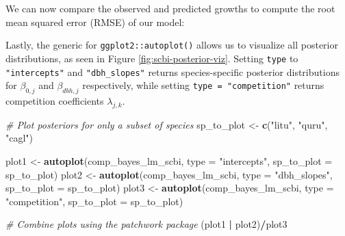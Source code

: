 \documentclass[12pt]{article}
\newenvironment{Shaded}{\begin{snugshade}}{\end{snugshade}}
\newcommand{\CommentTok}[1]{\textcolor[rgb]{0.56,0.35,0.01}{\textit{#1}}}
\newcommand{\DataTypeTok}[1]{\textcolor[rgb]{0.13,0.29,0.53}{#1}}
\newcommand{\KeywordTok}[1]{\textcolor[rgb]{0.13,0.29,0.53}{\textbf{#1}}}
\newcommand{\NormalTok}[1]{#1}
\newcommand{\OperatorTok}[1]{\textcolor[rgb]{0.81,0.36,0.00}{\textbf{#1}}}
\newcommand{\StringTok}[1]{\textcolor[rgb]{0.31,0.60,0.02}{#1}}
\begin{document}
We can now compare the observed and predicted growths to compute the
root mean squared error (RMSE) of our model:

\begin{Shaded}
\end{Shaded}

Lastly, the generic for \texttt{ggplot2::autoplot()} allows us to
visualize all posterior distributions, as seen in Figure
\ref{fig:scbi-posterior-viz}. Setting \texttt{type} to
\texttt{"intercepts"} and \texttt{"dbh\_slopes"} returns
species-specific posterior distributions for \(\beta_{0,j}\) and
\(\beta_{dbh,j}\) respectively, while setting
\texttt{type\ =\ "competition"} returns competition coefficients
\(\lambda_{j,k}\).

\begin{Shaded}
\begin{Highlighting}[]
\CommentTok{# Plot posteriors for only a subset of species}
\NormalTok{sp_to_plot <-}\StringTok{ }\KeywordTok{c}\NormalTok{(}\StringTok{"litu"}\NormalTok{, }\StringTok{"quru"}\NormalTok{, }\StringTok{"cagl"}\NormalTok{)}

\NormalTok{plot1 <-}\StringTok{ }\KeywordTok{autoplot}\NormalTok{(comp_bayes_lm_scbi, }\DataTypeTok{type =} \StringTok{"intercepts"}\NormalTok{, }\DataTypeTok{sp_to_plot =}\NormalTok{ sp_to_plot)}
\NormalTok{plot2 <-}\StringTok{ }\KeywordTok{autoplot}\NormalTok{(comp_bayes_lm_scbi, }\DataTypeTok{type =} \StringTok{"dbh_slopes"}\NormalTok{, }\DataTypeTok{sp_to_plot =}\NormalTok{ sp_to_plot)}
\NormalTok{plot3 <-}\StringTok{ }\KeywordTok{autoplot}\NormalTok{(comp_bayes_lm_scbi, }\DataTypeTok{type =} \StringTok{"competition"}\NormalTok{, }\DataTypeTok{sp_to_plot =}\NormalTok{ sp_to_plot)}

\CommentTok{# Combine plots using the patchwork package}
\NormalTok{(plot1 }\OperatorTok{|}\StringTok{ }\NormalTok{plot2)}\OperatorTok{/}\NormalTok{plot3}
\end{Highlighting}
\end{Shaded}
\end{document}
